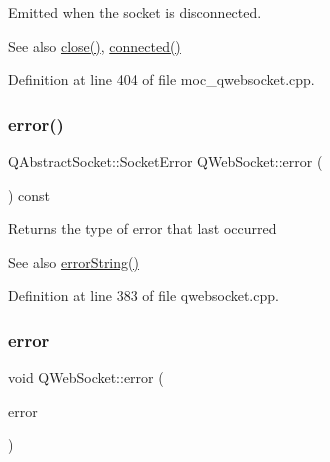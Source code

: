 Emitted when the socket is disconnected. 

\begin{DoxySeeAlso}{See also}
\mbox{\hyperlink{class_q_web_socket_ae1c9af16e7f53666ccd423864b8e2c35}{close()}}, \mbox{\hyperlink{class_q_web_socket_a176c51371ba6d3b13fec0f7f287b6102}{connected()}} 
\end{DoxySeeAlso}


Definition at line 404 of file moc\+\_\+qwebsocket.\+cpp.

\mbox{\label{class_q_web_socket_a98e9ba3091c73531678a55982f954dae}} 
\subsubsection{\texorpdfstring{error()}{error()}\hspace{0.1cm}{\footnotesize\ttfamily [1/2]}}
{\footnotesize\ttfamily Q\+Abstract\+Socket\+::\+Socket\+Error Q\+Web\+Socket\+::error (\begin{DoxyParamCaption}{ }\end{DoxyParamCaption}) const}

Returns the type of error that last occurred \begin{DoxySeeAlso}{See also}
\mbox{\hyperlink{class_q_web_socket_aed6ec5ee08cb1d5b3ca4d562cf1cb1b8}{error\+String()}} 
\end{DoxySeeAlso}


Definition at line 383 of file qwebsocket.\+cpp.

\mbox{\label{class_q_web_socket_a2c8b42c52eef7982f50dd1131b3133f6}} 
\subsubsection{\texorpdfstring{error}{error}\hspace{0.1cm}{\footnotesize\ttfamily [2/2]}}
{\footnotesize\ttfamily void Q\+Web\+Socket\+::error (\begin{DoxyParamCaption}\item[{Q\+Abstract\+Socket\+::\+Socket\+Error}]{error }\end{DoxyParamCaption})\hspace{0.3cm}{\ttfamily [signal]}}

